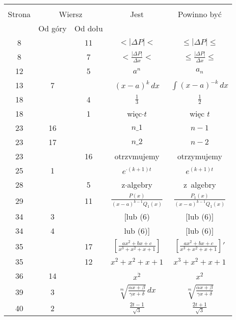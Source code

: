 \documentclass[a4paper,11pt]{article}
\begin{document}
\begin{center}

  \begin{tabular}{|c|c|c|c|c|}
    \hline
    & \multicolumn{2}{c|}{} & & \\
    Strona & \multicolumn{2}{c|}{Wiersz} & Jest
                              & Powinno być \\ \cline{2-3}
    & Od góry & Od dołu & & \\
    \hline
    8   & & 11 & $< | \Delta P | <$ & $\leq | \Delta P | \leq$ \\[0.2em]
    8   & &  7 & $< \frac{ | \Delta P | }{ \Delta x } <$
           & $\leq \frac{ | \Delta P | }{ \Delta x } \leq$ \\[0.2em]
    12  & &  5 & $a^{ n }$ & $a_{ n }$ \\
    13  &  7 & & $( x - a )^{ k } \, dx$ & $\int ( x - a )^{ -k } \, dx$ \\
    18  & &  4 & $\frac{ 1 }{ 3 }$ & $\frac{ 1 }{ 2 }$ \\
    18  & &  1 & więc$\cdot t$ & więc $t$ \\
    23  & 16 & & $n \_ 1$ & $n - 1$ \\
    23  & 17 & & $n \_ 2$ & $n - 2$ \\
    23  & & 16 & otrzvmujemy & otrzymujemy \\
    25  &  1 & & $e^{ \cdot ( k + 1 ) t}$ & $e^{ ( k + 1 ) t}$ \\
    28  & &  5 & z$\cdot$algebry & z~algebry \\[0.2em]
    29  & & 11 & $\frac{ P( x ) }{ ( x - a )^{ k - 1 } Q_{ 1 }( x ) }$
           & $\frac{ P_{ 1 }( x ) }{ ( x - a )^{ k - 1 } Q_{ 1 }( x ) }$
    \\[0.3em]
    34  &  3 & & [lub (6) & [lub (6)] \\
    34  &  4 & & lub (6)] & [lub (6)] \\[0.2em]
    35  & & 17 & $\left[ \frac{ a x^{ 2 } + b x + c }
                 { x^{ 3 } + x^{ 2 } + x + 1 } \right]$
           & $\left[ \frac{ a x^{ 2 } + b x + c }
             { x^{ 3 } + x^{ 2 } + x + 1 } \right]'$ \\[0.4em]
    35  & & 12 & $x^{ 2 } + x^{ 2 } + x + 1$
           & $x^{ 3 } + x^{ 2 } + x + 1$ \\
    36  & 14 & & $x^{ \dot{ 2 } }$ & $x^{ 2 }$ \\[0.2em]
    39  &  3 & & $\sqrt[ m ]{ \frac{ \alpha x + \beta }{ \gamma x + \delta } } \, dx$
           & $\sqrt[ m ]{ \frac{ \alpha x + \beta }{ \gamma x + \delta } }$ \\[0.2em]
    40  &  2 & & $\frac{ 2t - 1 }{ \sqrt{ 3 } }$
           & $\frac{ 2t + 1 }{ \sqrt{ 3 } }$ \\
    \hline
  \end{tabular}






\end{center}
\end{document}
